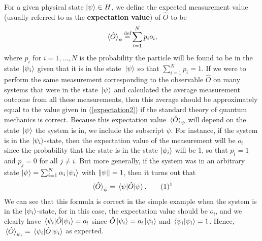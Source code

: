 For a given physical state $\ket{\psi}\in H$, we define the expected measurement value (usually referred to as the \textbf{expectation value}) of $\hat{O}$ to be 
\begin{equation}\label{expectation2}
\ev*{\hat{O}}_\psi\myeq\sum_{i=1}^N p_io_i,
\end{equation}
where $p_i$ for $i=1,\ldots, N$ is the probability the particle will be found to be in the state $\ket*{\psi_i}$ given that it is in the state $\ket*{\psi}$ so that  $\sum_{i=1}^N p_i=1$. If we were to perform the same measurement corresponding to the observable $\hat{O}$ on many systems that were in the state $\ket*{\psi}$ and calculated the average measurement outcome from all these measurements, then this average should be approximately equal to the value given in (\ref{expectation2}) if the standard theory of quantum mechanics is correct. Because this expectation value $\ev*{\hat{O}}_\psi$ will depend on the state $\ket*{\psi}$ the system is in, we include the subscript $\psi$. For instance, if the system is in the $\ket{\psi_i}$-state, then the expectation value of the measurement will be $o_i$ since the probability that the state is in the state $\ket{\psi_i}$ will be 1, so that $p_i=1$ and $p_j=0$ for all $j\neq i$. But more generally, if the system was in an arbitrary state $\ket{\psi}=\sum_{i=1}^N \alpha_i\ket{\psi_i}$ with $\norm{\psi}=1$, then it turns out that 
\begin{equation}\refstepcounter{equation}\label{evev}\ev*{\hat{O}}_\psi=\ev*{\hat{O}}{\psi}.\tag{\theequation}\protect\footnotemark
\end{equation}We can see that this formula is correct in the simple example when the system is in the $\ket{\psi_i}$-state, for in this case, the expectation value should be $o_i$, and we clearly have $\ev*{\hat{O}}{\psi_i}=o_i$ since $\hat{O}\ket{\psi_i}=o_i\ket{\psi_i}$ and $\ip*{\psi_i}=1$. Hence, $\ev*{\hat{O}}_{\psi_i}=\ev*{\hat{O}}{\psi_i}$ as expected.

